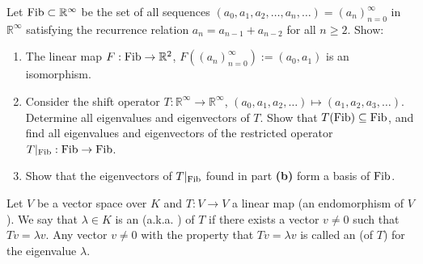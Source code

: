 \begin{exercise}
  \label{exc:fibonacci_sequence_space_shift_eigenvalues}
  Let $\operatorname{Fib} \subset \mathbb{R}^\infty$ be the set of all sequences $(a_0, a_1, a_2, \dots, a_n, \dots) = (a_n)_{n=0}^\infty$ in $\mathbb{R}^\infty$ satisfying the recurrence relation $a_n = a_{n-1} + a_{n-2}$ for all $n \ge 2$. Show:
  \begin{enumerate}[label=\textbf{(\alph*)}]
    \item The linear map $F : \operatorname{Fib} \to \mathbb{R}^2$, $F((a_n)_{n=0}^\infty) := (a_0, a_1)$ is an isomorphism.
    \item Consider the shift operator $T : \mathbb{R}^\infty \to \mathbb{R}^\infty$, $(a_0, a_1, a_2, \dots) \mapsto (a_1, a_2, a_3, \dots)$. Determine all eigenvalues and eigenvectors of $T$. Show that $T(\operatorname{Fib}) \subseteq \operatorname{Fib}$, and find all eigenvalues and eigenvectors of the restricted operator $T|_{\operatorname{Fib}} : \operatorname{Fib} \to \operatorname{Fib}$.
    \item Show that the eigenvectors of $T|_{\operatorname{Fib}}$ found in part \textbf{(b)} form a basis of $\operatorname{Fib}$.
  \end{enumerate}
\end{exercise}

\begin{definition}\label{def:eigenvalue_eigenvector}
  Let $V$ be a vector space over $K$ and $T: V \rightarrow V$ a linear map (an endomorphism of $V$). We say that $\lambda \in K$ is an  (a.k.a. ) of $T$ if there exists a vector $v \ne 0$ such that $Tv = \lambda v$. Any vector $v \ne 0$ with the property that $Tv = \lambda v$ is called an  (of $T$) for the eigenvalue $\lambda$.
\end{definition}

